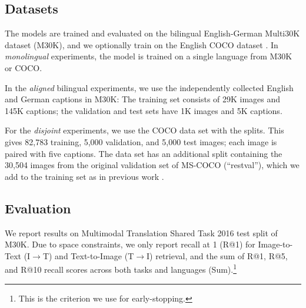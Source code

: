 \subsection{Datasets}

The models are trained and evaluated on the bilingual English-German Multi30K dataset (M30K), and we
optionally train on the English COCO dataset 
\cite{DBLP:journals/corr/ChenFLVGDZ15}. In \textit{monolingual} 
experiments, the model is trained on a single language from M30K or 
COCO.

In the \emph{aligned} bilingual experiments, we use the
independently collected English and German captions in M30K:
The training set consists of 29K images and 145K captions; the validation and test sets have 1K images and 5K captions. 

For the \emph{disjoint} experiments, we use the COCO data set
with the \cite{karpathy2015deep} splits. This gives 82,783 training,
5,000 validation, and 5,000 test images; each image is paired with five captions.
The data set has an additional split containing the  
30,504 images from the original validation set of 
MS-COCO (``restval''),
 which we add to the training set as in previous work \cite{karpathy2015deep,vendrov2016order,faghri2017vse++}.
 


\subsection{Evaluation}
We report results on Multimodal Translation Shared Task 2016 test split \cite{specia2016shared} of M30K. 
Due to space constraints, we only report recall at 1 (R@1) for 
Image-to-Text (I$\rightarrow$T) and Text-to-Image (T$\rightarrow$I)
retrieval, and the sum of R@1, R@5, and R@10 recall scores across both tasks and languages (Sum).\footnote{This is the criterion we use
for early-stopping.}

